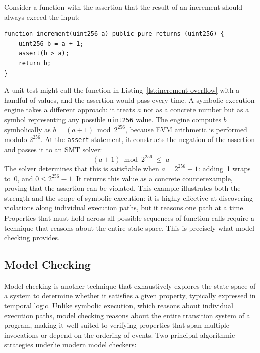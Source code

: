 Consider a function with the assertion that the result of an increment should always exceed the input:

\begin{listing}[!ht]
\begin{verbatim}
function increment(uint256 a) public pure returns (uint256) {
    uint256 b = a + 1;
    assert(b > a);
    return b;
}
\end{verbatim}
\caption[Simple increment function.]{Simple increment function with an overflow-checking assertion.}
\label{lst:increment-overflow}
\end{listing}

A unit test might call the function in Listing~\ref{lst:increment-overflow} with a handful of values, and the assertion would pass every time. A symbolic execution engine takes a different approach: it treats $a$ not as a concrete number but as a symbol representing any possible \texttt{uint256} value. The engine computes $b$ symbolically as $b = (a + 1) \bmod 2^{256}$, because EVM arithmetic is performed modulo $2^{256}$. At the \texttt{assert} statement, it constructs the negation of the assertion and passes it to an SMT solver:
%
\[
    (a + 1) \bmod 2^{256} \;\leq\; a
\]
%
The solver determines that this is satisfiable when $a = 2^{256} - 1$: adding~1 wraps to~0, and $0 \leq 2^{256} - 1$. It returns this value as a concrete counterexample, proving that the assertion can be violated. This example illustrates both the strength and the scope of symbolic execution: it is highly effective at discovering violations along individual execution paths, but it reasons one path at a time. Properties that must hold across all possible sequences of function calls require a technique that reasons about the entire state space. This is precisely what model checking provides.

\subsection{Model Checking}
\label{subsec:model-checking}

Model checking is another technique that exhaustively explores the state space of a system to determine whether it satisfies a given property, typically expressed in temporal logic. Unlike symbolic execution, which reasons about individual execution paths, model checking reasons about the entire transition system of a program, making it well-suited to verifying properties that span multiple invocations or depend on the ordering of events. Two principal algorithmic strategies underlie modern model checkers:

